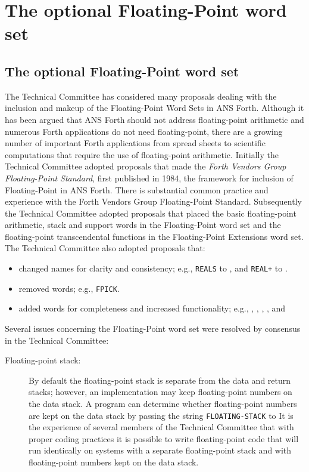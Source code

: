\chapter{The optional Floating-Point word set} %

\begin{info}
\section{The optional Floating-Point word set} %

The Technical Committee has considered many proposals dealing with
the inclusion and makeup of the Floating-Point Word Sets in ANS
Forth. Although it has been argued that ANS Forth should not address
floating-point arithmetic and numerous Forth applications do not need
floating-point, there are a growing number of important Forth
applications from spread sheets to scientific computations that
require the use of floating-point arithmetic. Initially the Technical
Committee adopted proposals that made the \emph{Forth Vendors Group
Floating-Point Standard}, first published in 1984, the framework for
inclusion of Floating-Point in ANS Forth. There is substantial common
practice and experience with the Forth Vendors Group Floating-Point
Standard. Subsequently the Technical Committee adopted proposals that
placed the basic floating-point arithmetic, stack and support words
in the Floating-Point word set and the floating-point transcendental
functions in the Floating-Point Extensions word set. The Technical
Committee also adopted proposals that:

\begin{itemize}
\item changed names for clarity and consistency; e.g.,
	\texttt{REALS} to , and
	\texttt{REAL+} to .
\item removed words; e.g., \texttt{FPICK}.
\item added words for completeness and increased functionality; e.g.,
	,
	,
	,
	,
	 and
\end{itemize}

Several issues concerning the Floating-Point word set were resolved
by consensus in the Technical Committee:

\begin{description}
\item [Floating-point stack:]
	By default the floating-point stack is separate from the data
	and return stacks; however, an implementation may keep
	floating-point numbers on the data stack. A program can determine
	whether floating-point numbers are kept on the data stack by
	passing the string \texttt{FLOATING-STACK} to 
	It is the experience of several members of the Technical Committee
	that with proper coding practices it is possible to write
	floating-point code that will run identically on systems with a
	separate floating-point stack and with floating-point numbers kept
	on the data stack.


\end{description}
\end{info}
